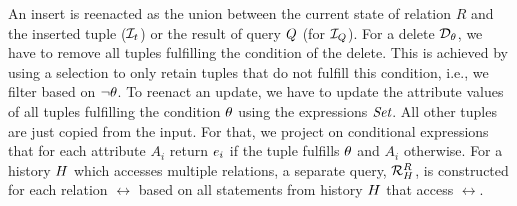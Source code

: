 An insert is reenacted as the union between the current state of relation $R$ and the inserted tuple ($\mathcal{I}_{t}$) or the result of query $Q$ (for $\mathcal{I}_{Q}$). For a delete $\mathcal{D}_{\theta}$, we have to remove all tuples fulfilling the condition of the delete. This is achieved by using a selection to only retain tuples that do not fulfill this condition, i.e., we filter based on $\neg \theta$. To reenact an update, we have to update the attribute values of all tuples fulfilling the condition $\theta$ using the expressions $\textit{Set}$. All other tuples are just copied from the input. For that, we project on conditional expressions that for each attribute $A_i$ return $e_i$ if the tuple fulfills $\theta$ and $A_i$ otherwise.
For a history $H$ which accesses multiple relations, a separate query,  $\mathcal{R}^{R}_{H}$, is constructed for each relation $\rel$ based on all statements from  history $H$ that access $\rel$.

